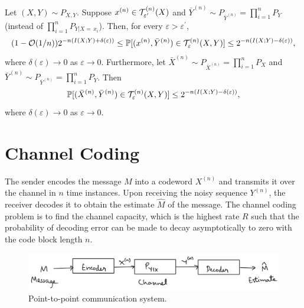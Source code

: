 \documentclass[11pt,a4paper]{article}
\begin{document}
\begin{theorem}
    Let $(X,Y)\sim P_{X,Y}$. Suppose $x^{(n)}\in\mathcal{T}^{(n)}_{\varepsilon^\prime}(X)$ and $\bar{Y}^{(n)}\sim P_{\bar{Y}^{(n)}} = \prod_{i=1}^{n} P_{Y}$ (instead of $\prod_{i=1}^{n} P_{Y|X =\,x_i}$). Then, for every $\varepsilon > \varepsilon^\prime$,
    \begin{equation*}
        (1-\mathcal{O}(1/n))2^{-n(I(X;Y)+\delta(\varepsilon))} \le \mathbb{P}[(x^{(n)}, \bar{Y}^{(n)})\in\mathcal{T}^{(n)}_\varepsilon(X,Y)] \le 2^{-n(I(X;Y)-\delta(\varepsilon))},
    \end{equation*}
    where $\delta(\varepsilon) \rightarrow 0$ as $\varepsilon \rightarrow 0$. Furthermore, let $\bar{X}^{(n)} \sim P_{\bar{X}^{(n)}} = \prod_{i=1}^{n} P_{X}$ and $\bar{Y}^{(n)}\sim P_{\bar{Y}^{(n)}} = \prod_{i=1}^{n} P_{Y}$. Then 
    \begin{equation*}
        \mathbb{P}[(\bar{X}^{(n)}, \bar{Y}^{(n)})\in\mathcal{T}^{(n)}_\varepsilon(X,Y)] \le 2^{-n(I(X;Y)-\delta(\varepsilon))},
    \end{equation*}
    where $\delta(\varepsilon) \rightarrow 0$ as $\varepsilon \rightarrow 0$.
\end{theorem}

\section{Channel Coding}

\begin{problem*}
    The sender encodes the message $M$ into a codeword $X^{(n)}$ and transmits it over the channel in $n$ time instances. Upon receiving the
    noisy sequence $Y^{(n)}$, the receiver decodes it to obtain the estimate $\hat{M}$ of the message. The channel coding problem is to find the channel capacity, which is the highest rate $R$ such that the probability of decoding error can be made to decay asymptotically to zero with
    the code block length $n$.
\end{problem*}

\begin{figure}[ht]
    \centering
    \includegraphics[width=\linewidth]{images/Channel_Coding.png}
    \caption{Point-to-point communication system.}
    \label{fig:Channel_Coding}
\end{figure}
\end{document}
